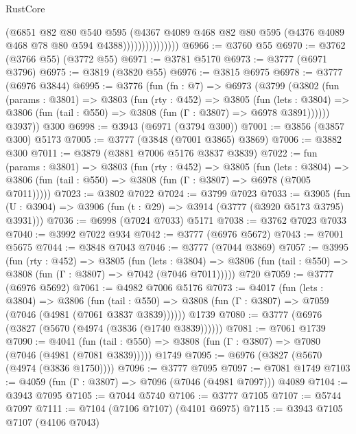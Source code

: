 \begin{lexlean}{RustCore}
\begin{coremodule}
                            (@6851
                              @82
                              @80
                              @540
                              @595
                              (@4367
                                @4089
                                @468
                                @82
                                @80
                                @595
                                (@4376 @4089 @468 @78 @80 @594 @4388)))))))))))))))
@6966 := @3760 @55
@6970 := @3762 (@3766 @55) (@3772 @55)
@6971 := @3781 @5170
@6973 := @3777 (@6971 @3796)
@6975 := @3819 (@3820 @55)
@6976 := @3815 @6975
@6978 := @3777 (@6976 @3844)
@6995 := @3776
    (fun (fn : @7) =>
    @6973
      (@3799
        (@3802
          (fun (params : @3801) =>
          @3803
            (fun (rty : @452) =>
            @3805
              (fun (lets : @3804) =>
              @3806 (fun (tail : @550) => @3808 (fun (Γ : @3807) => @6978 @3891))))))
        @3937))
    @300
@6998 := @3943 (@6971 (@3794 @300))
@7001 := @3856 (@3857 @300) @5173
@7005 := @3777 (@3848 (@7001 @3865) @3869)
@7006 := @3882 @300
@7011 := @3879 (@3881 @7006 @5176 @3837 @3839)
@7022 := fun (params : @3801) =>
  @3803
    (fun (rty : @452) =>
    @3805
      (fun (lets : @3804) =>
      @3806 (fun (tail : @550) => @3808 (fun (Γ : @3807) => @6978 (@7005 @7011)))))
@7023 := @3802 @7022
@7024 := @3799 @7023
@7033 := @3905 (fun (U : @3904) => @3906 (fun (t : @29) => @3914 (@3777 (@3920 @5173 @3795) @3931)))
@7036 := @6998 (@7024 @7033) @5171
@7038 := @3762 @7023 @7033
@7040 := @3992 @7022 @934
@7042 := @3777 (@6976 @5672)
@7043 := @7001 @5675
@7044 := @3848 @7043
@7046 := @3777 (@7044 @3869)
@7057 := @3995
    (fun (rty : @452) =>
    @3805
      (fun (lets : @3804) =>
      @3806 (fun (tail : @550) => @3808 (fun (Γ : @3807) => @7042 (@7046 @7011)))))
    @720
@7059 := @3777 (@6976 @5692)
@7061 := @4982 @7006 @5176
@7073 := @4017
    (fun (lets : @3804) =>
    @3806
      (fun (tail : @550) => @3808 (fun (Γ : @3807) => @7059 (@7046 (@4981 (@7061 @3837 @3839))))))
    @1739
@7080 := @3777 (@6976 (@3827 (@5670 (@4974 (@3836 (@1740 @3839))))))
@7081 := @7061 @1739
@7090 := @4041
    (fun (tail : @550) => @3808 (fun (Γ : @3807) => @7080 (@7046 (@4981 (@7081 @3839)))))
    @1749
@7095 := @6976 (@3827 (@5670 (@4974 (@3836 @1750))))
@7096 := @3777 @7095
@7097 := @7081 @1749
@7103 := @4059 (fun (Γ : @3807) => @7096 (@7046 (@4981 @7097))) @4089
@7104 := @3943 @7095
@7105 := @7044 @5740
@7106 := @3777 @7105
@7107 := @5744 @7097
@7111 := @7104 (@7106 @7107) (@4101 @6975)
@7115 := @3943 @7105 @7107 (@4106 @7043)

\end{coremodule}
\end{lexlean}
